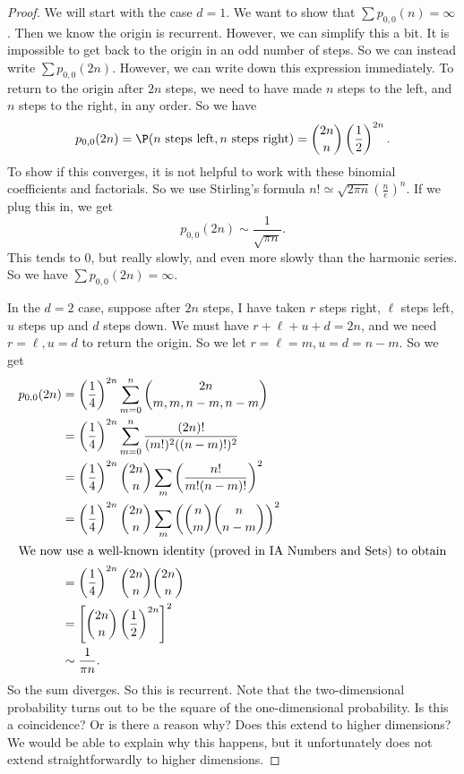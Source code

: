 \documentclass[a4paper]{article}
\begin{document}
\begin{proof}
  We will start with the case $d = 1$. We want to show that $\sum p_{0, 0}(n) = \infty$. Then we know the origin is recurrent. However, we can simplify this a bit. It is impossible to get back to the origin in an odd number of steps. So we can instead write $\sum p_{0, 0}(2n)$. However, we can write down this expression immediately. To return to the origin after $2n$ steps, we need to have made $n$ steps to the left, and $n$ steps to the right, in any order. So we have
  \[
    p_{0, 0}(2n) = \P(n\text{ steps left}, n\text{ steps right}) = \binom{2n}{n} \left(\frac{1}{2}\right)^{2n}.
  \]
  To show if this converges, it is not helpful to work with these binomial coefficients and factorials. So we use Stirling's formula $n! \simeq \sqrt{2\pi n}\left(\frac{n}{e}\right)^n$. If we plug this in, we get
  \[
    p_{0, 0}(2n) \sim \frac{1}{\sqrt{\pi n}}.
  \]
  This tends to $0$, but really slowly, and even more slowly than the harmonic series. So we have $\sum p_{0, 0}(2n) = \infty$.

  In the $d = 2$ case, suppose after $2n$ steps, I have taken $r$ steps right, $\ell$ steps left, $u$ steps up and $d$ steps down. We must have $r + \ell + u + d = 2n$, and we need $r = \ell, u = d$ to return the origin. So we let $r = \ell = m, u = d = n - m$. So we get
  \begin{align*}
    p_{0, 0}(2n) &= \left(\frac{1}{4}\right)^{2n} \sum_{m = 0}^n \binom{2n}{m, m, n - m, n - m} \\
    &= \left(\frac{1}{4}\right)^{2n} \sum_{m = 0}^n \frac{(2n)!}{(m!)^2 ((n - m)!)^2} \\
    &= \left(\frac{1}{4}\right)^{2n} \binom{2n}{n}\sum_m \left(\frac{n!}{m!(n - m)!}\right)^2\\
    &= \left(\frac{1}{4}\right)^{2n} \binom{2n}{n}\sum_m \left(\binom{n}{m}\binom{n}{n - m}\right)^2\\
    \intertext{We now use a well-known identity (proved in IA Numbers and Sets) to obtain}
    &= \left(\frac{1}{4}\right)^{2n} \binom{2n}{n} \binom{2n}{n}\\
    &= \left[\binom{2n}{n} \left(\frac{1}{2}\right)^{2n}\right]^2\\
    &\sim \frac{1}{\pi n}.
  \end{align*}
  So the sum diverges. So this is recurrent. Note that the two-dimensional probability turns out to be the square of the one-dimensional probability. Is this a coincidence? Or is there a reason why? Does this extend to higher dimensions? We would be able to explain why this happens, but it unfortunately does not extend straightforwardly to higher dimensions.


\end{proof}
\end{document}
